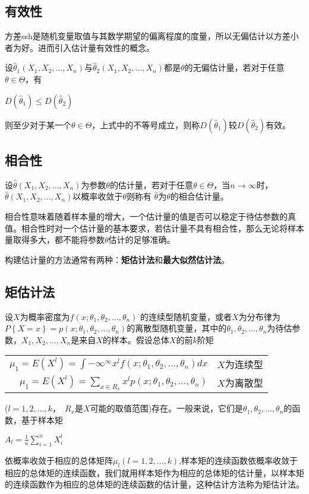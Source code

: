 \documentclass[11pt]{book}
\newcounter{#2}
\newcounter{#2}[#1]
\numberwithin{#2}{#1}
\begin{document}
\subsection{有效性}
方差ssh是随机变量取值与其数学期望的偏离程度的度量，所以无偏估计以方差小者为好。进而引入估计量有效性的概念。
\begin{newdef}
	设$\hat{\theta}_1(X_1,X_2,\dots,X_n)$与$\hat{\theta}_2(X_1,X_2,\dots,X_n)$都是$\theta$的无偏估计量，若对于任意$\theta\in\Theta$，有
	\begin{center}
		$D(\hat{\theta}_1) \le D(\hat{\theta}_2)$
	\end{center}
	则至少对于某一个$\theta\in\Theta$，上式中的不等号成立，则称$D(\hat{\theta}_1)$较$D(\hat{\theta}_2)$有效。
\end{newdef}
\subsection{相合性}
\begin{newdef}
	设$\hat{\theta}(X_1,X_2,\dots,X_n)$为参数$\theta$的估计量，若对于任意$\theta\in\Theta$，当$n\to\infty$时，$\hat{\theta}(X_1,X_2,\dots,X_n)$以概率收敛于$\theta$则称有
	$\hat{\theta}$为$\theta$的相合估计量。
\end{newdef}
相合性意味着随着样本量的增大，一个估计量的值是否可以稳定于待估参数的真值。相合性时对一个估计量的基本要求，若估计量不具有相合性，那么无论将样本量取得多大，都不能将参数$\theta$估计的足够准确。
	
	构建估计量的方法通常有两种：\textbf{矩估计法}和\textbf{最大似然估计法}。
	
	\subsection{矩估计法}
	设$X$为概率密度为$f(x;\theta_1,\theta_2,\dots,\theta_n)$ 的连续型随机变量，或者$X$为分布律为$P\left\lbrace X=x\right\rbrace =p(x;\theta_1,\theta_2,\dots,\theta_n)$的离散型随机变量，其中的$\theta_1,\theta_2,\dots,\theta_n$为待估参数，$X_1,X_2,\dots,X_n$是来自$X$的样本。假设总体$X$的前$k$阶矩
	\begin{center}
		\begin{tabular}{r l}
			$ \mu_1 = E(X^l) = \int{-\infty}^{\infty} x^l f(x;\theta_1,\theta_2,\dots,\theta_n) dx$ & $X$为连续型\\
			$ \mu_1 = E(X^l) = \sum\limits_{x \in R_x} x^l p(x;\theta_1,\theta_2,\dots,\theta_n)$  & $X$为离散型\\
		\end{tabular}
	\end{center}
	($l=1,2,\dots,k$，\ $R_x$是$X$可能的取值范围)存在。一般来说，它们是$\theta_1,\theta_2,\dots,\theta_n$的函数，基于样本矩
	\begin{center}
		$ A_l= \frac{1}{n}\sum\limits_{i=1}^n X_i^l $
	\end{center}
依概率收敛于相应的总体矩阵$\mu_l(l=1,2,\dots,k)$,样本矩的连续函数依概率收敛于相应的总体矩的连续函数，我们就用样本矩作为相应的总体矩的估计量，以样本矩的连续函数作为相应的总体矩的连续函数的估计量，这种估计方法称为矩估计法。
\end{document}
